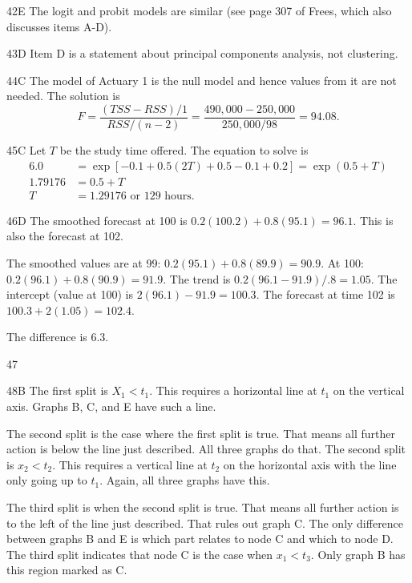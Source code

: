 \begin{solution}{42}{E}
The logit and probit models are similar (see page 307 of Frees, which also discusses items A-D).
\end{solution}

\begin{solution}{43}{D}
Item D is a statement about principal components analysis, not clustering.
\end{solution}

\begin{solution}{44}{C}
The model of Actuary 1 is the null model and hence values from it are not needed. The solution is
\[
F = \dfrac{(TSS - RSS)/1}{RSS/(n-2)} = \dfrac{490{,}000 - 250{,}000}{250{,}000/98} = 94.08.
\]
\end{solution}

\begin{solution}{45}{C}
Let $T$ be the study time offered. The equation to solve is
\begin{align*}
6.0 &= \exp[-0.1 + 0.5(2T) + 0.5 - 0.1 + 0.2] = \exp(0.5 + T) \\
1.79176 &= 0.5 + T \\
T &= 1.29176 \text{ or } 129 \text{ hours.}
\end{align*}
\end{solution}

\begin{solution}{46}{D}
The smoothed forecast at 100 is $0.2(100.2) + 0.8(95.1) = 96.1$. This is also the forecast at 102.

The smoothed values are at 99: $0.2(95.1) + 0.8(89.9) = 90.9$. At 100: $0.2(96.1) + 0.8(90.9) = 91.9$. The trend is $0.2(96.1 - 91.9)/.8 = 1.05$. The intercept (value at 100) is $2(96.1) - 91.9 = 100.3$. The forecast at time 102 is $100.3 + 2(1.05) = 102.4$.

The difference is 6.3.
\end{solution}

\begin{solution}{47}{}
\deleted
\end{solution}

\begin{solution}{48}{B}
The first split is $X_1 < t_1$. This requires a horizontal line at $t_1$ on the vertical axis. Graphs B, C, and E have such a line.

The second split is the case where the first split is true. That means all further action is below the line just described. All three graphs do that. The second split is $x_2 < t_2$. This requires a vertical line at $t_2$ on the horizontal axis with the line only going up to $t_1$. Again, all three graphs have this.

The third split is when the second split is true. That means all further action is to the left of the line just described. That rules out graph C. The only difference between graphs B and E is which part relates to node C and which to node D. The third split indicates that node C is the case when $x_1 < t_3$. Only graph B has this region marked as C.
\end{solution}

